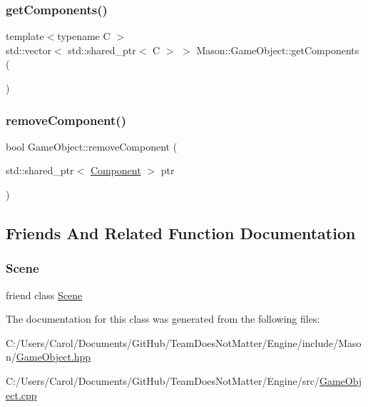 \subsubsection{\texorpdfstring{get\+Components()}{getComponents()}}
{\footnotesize\ttfamily template$<$typename C $>$ \\
std\+::vector$<$ std\+::shared\+\_\+ptr$<$ C $>$ $>$ Mason\+::\+Game\+Object\+::get\+Components (\begin{DoxyParamCaption}{ }\end{DoxyParamCaption})}

\hypertarget{class_mason_1_1_game_object_af22f654507a0f6a5056c0d99bc6cd1b8}{}\label{class_mason_1_1_game_object_af22f654507a0f6a5056c0d99bc6cd1b8} 
\subsubsection{\texorpdfstring{remove\+Component()}{removeComponent()}}
{\footnotesize\ttfamily bool Game\+Object\+::remove\+Component (\begin{DoxyParamCaption}\item[{std\+::shared\+\_\+ptr$<$ \hyperlink{class_mason_1_1_component}{Component} $>$}]{ptr }\end{DoxyParamCaption})}



\subsection{Friends And Related Function Documentation}
\hypertarget{class_mason_1_1_game_object_a032858ae1fe02d2d1170981c2af2d67c}{}\label{class_mason_1_1_game_object_a032858ae1fe02d2d1170981c2af2d67c} 
\subsubsection{\texorpdfstring{Scene}{Scene}}
{\footnotesize\ttfamily friend class \hyperlink{class_mason_1_1_scene}{Scene}\hspace{0.3cm}{\ttfamily [friend]}}



The documentation for this class was generated from the following files\+:\begin{DoxyCompactItemize}
\item 
C\+:/\+Users/\+Carol/\+Documents/\+Git\+Hub/\+Team\+Does\+Not\+Matter/\+Engine/include/\+Mason/\hyperlink{_game_object_8hpp}{Game\+Object.\+hpp}\item 
C\+:/\+Users/\+Carol/\+Documents/\+Git\+Hub/\+Team\+Does\+Not\+Matter/\+Engine/src/\hyperlink{_game_object_8cpp}{Game\+Object.\+cpp}\end{DoxyCompactItemize}
